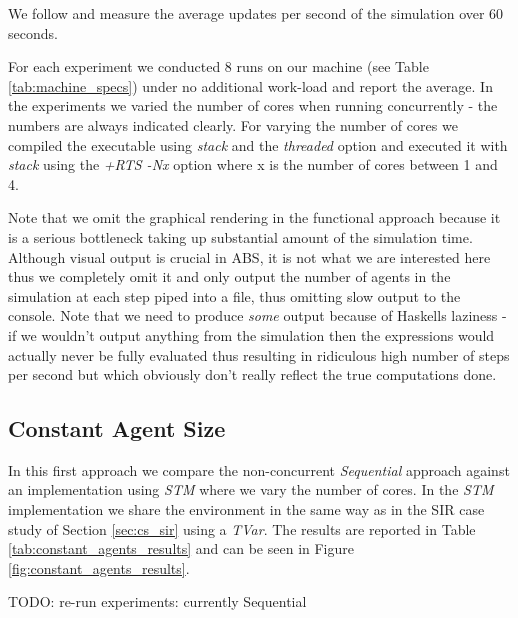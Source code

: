 We follow \cite{lysenko_framework_2008} and measure the average updates per second of the simulation over 60 seconds.

For each experiment we conducted 8 runs on our machine (see Table \ref{tab:machine_specs}) under no additional work-load and report the average. In the experiments we varied the number of cores when running concurrently - the numbers are always indicated clearly. For varying the number of cores we compiled the executable using \textit{stack} and the \textit{threaded} option and executed it with \textit{stack} using the \textit{+RTS -Nx} option where x is the number of cores between 1 and 4.

Note that we omit the graphical rendering in the functional approach because it is a serious bottleneck taking up substantial amount of the simulation time. Although visual output is crucial in ABS, it is not what we are interested here thus we completely omit it and only output the number of agents in the simulation at each step piped into a file, thus omitting slow output to the console. Note that we need to produce \textit{some} output because of Haskells laziness - if we wouldn't output anything from the simulation then the expressions would actually never be fully evaluated thus resulting in ridiculous high number of steps per second but which obviously don't really reflect the true computations done.

\subsection{Constant Agent Size}
In this first approach we compare the non-concurrent \textit{Sequential} approach against an implementation using \textit{STM} where we vary the number of cores. In the \textit{STM} implementation we share the environment in the same way as in the SIR case study of Section \ref{sec:cs_sir} using a \textit{TVar}. The results are reported in Table \ref{tab:constant_agents_results} and can be seen in Figure \ref{fig:constant_agents_results}. 

TODO: re-run experiments: currently Sequential

